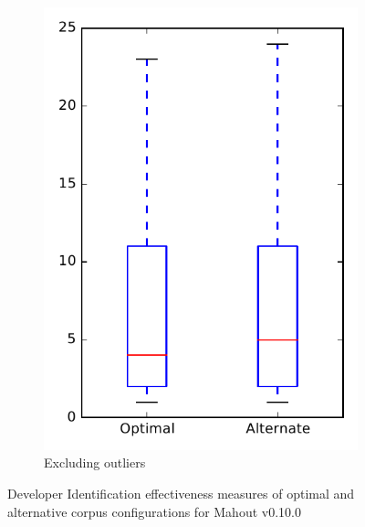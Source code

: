 \begin{figure}
\begin{subfigure}{.4\textwidth}
        \includegraphics[height=0.4\textheight]{figures/combo/dit_rq2_mahout_no_outlier}
        \caption{Excluding outliers}\label{fig:combo:dit:rq2:mahout_no_outlier}
    \end{subfigure}
\caption{Developer Identification effectiveness measures of optimal and alternative corpus configurations for Mahout v0.10.0}
\label{fig:combo:dit:rq2:mahout}
\end{figure}

